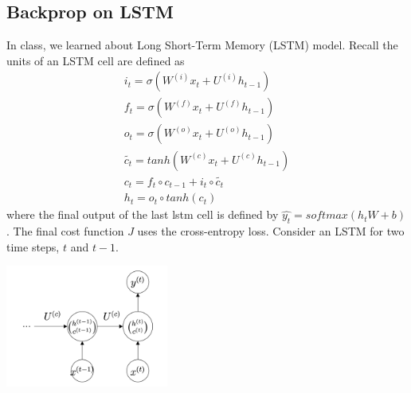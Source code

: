 \documentclass{assignment format}
\begin{document}
\subsection{Backprop on LSTM}
In class, we learned about Long Short-Term Memory (LSTM) model. Recall the units of an LSTM cell are defined as
\begin{align*}
i_{t}=\sigma(W^{(i)}x_{t} + U^{(i)}h_{t-1})\\
f_{t}=\sigma(W^{(f)}x_{t} + U^{(f)}h_{t-1})\\
o_{t}=\sigma(W^{(o)}x_{t} + U^{(o)}h_{t-1})\\
\tilde{c_{t}} = tanh(W^{(c)}x_{t} + U^{(c)}h_{t-1})\\
c_{t} = f_{t}\circ c_{t-1}+i_{t}\circ \tilde{c_{t}}\\
h_{t}=o_{t}\circ tanh(c_{t})
\end{align*}
where the final output of the last lstm cell is defined by $\hat{y_{t}}=softmax(h_{t}W+b)$. The final cost function $J$ uses the cross-entropy loss. Consider an LSTM for two time steps, $t$ and $t-1$.
    \begin{center}
        \captionsetup{width=0.4\textwidth}
        \includegraphics[width=0.4\textwidth]{LSTM.png}
        \label{LSTM-figure}
    \end{center}
\end{document}
